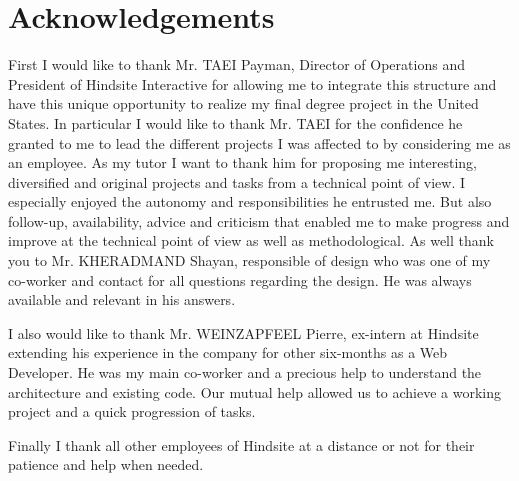 \chapter*{Acknowledgements}
First I would like to thank Mr. TAEI Payman, Director of Operations and President of
Hindsite Interactive for allowing me to integrate this structure and have this unique
opportunity to realize my final degree project in the United States.
In particular I would like to thank Mr. TAEI for the confidence he granted to me to
lead the different projects I was affected to by considering me as an employee.
As my tutor I want to thank him for proposing me interesting, diversified and original
projects and tasks from a technical point of view. I especially enjoyed the autonomy
and responsibilities he entrusted me. But also follow-up, availability, advice and
criticism that enabled me to make progress and improve at the technical point of
view as well as methodological.
As well thank you to Mr. KHERADMAND Shayan, responsible of design who was
one of my co-worker and contact for all questions regarding the design. He was
always available and relevant in his answers.

I also would like to thank Mr. WEINZAPFEEL Pierre, ex-intern at Hindsite extending his
experience in the company for other six-months as a Web Developer. He was my
main co-worker and a precious help to understand the architecture and existing
code. Our mutual help allowed us to achieve a working project and a quick
progression of tasks.

Finally I thank all other employees of Hindsite at a distance or not for their patience
and help when needed.